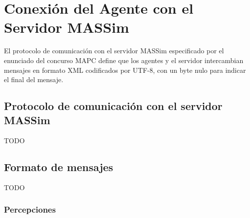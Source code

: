 










\section[Conexión con el MASSim Server]
 {Conexión del Agente con el Servidor MASSim}
 \label{sec:conexion_massim}

 El protocolo de comunicación con el servidor MASSim especificado por 
 el enunciado del concurso MAPC define que los agentes y el servidor 
 intercambian mensajes en formato XML codificados por UTF-8, con un 
 byte nulo para indicar el final del mensaje. 

\subsection[Protocolo del MASSim Server]
 {Protocolo de comunicación con el servidor MASSim}
 \label{sub:protocolo_massim}

 TODO

\subsection{Formato de mensajes}
 \label{sub:formato_mensajes}

 TODO

\subsubsection{Percepciones}
 \label{subsub:percepciones}

